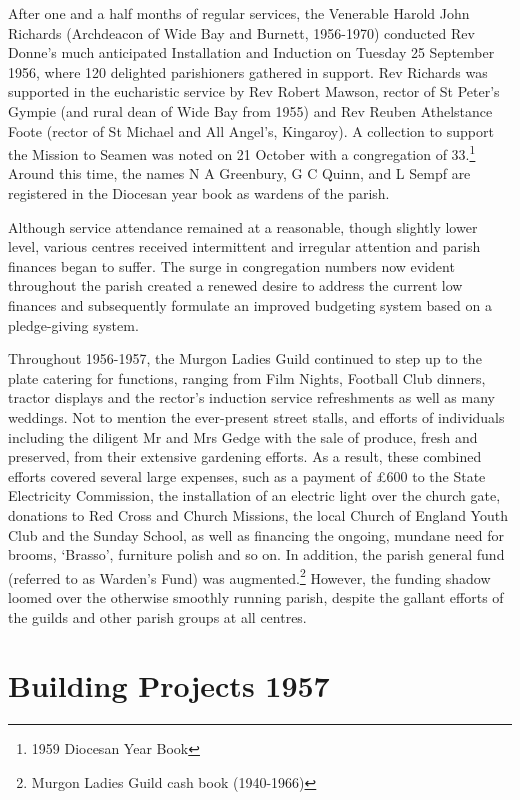 After one and a half months of regular services, the Venerable Harold John Richards (Archdeacon of Wide Bay and Burnett, 1956-1970) conducted Rev Donne's much anticipated Installation and Induction on Tuesday 25 September 1956, where 120 delighted parishioners gathered in support. Rev Richards was supported in the eucharistic service by Rev Robert Mawson, rector of St Peter's Gympie (and rural dean of Wide Bay from 1955) and Rev Reuben Athelstance Foote (rector of St Michael and All Angel's, Kingaroy). A collection to support the Mission to Seamen was noted on 21 October with a congregation of 33.\footnote{1959 Diocesan Year Book} Around this time, the names N A Greenbury, G C Quinn, and L Sempf are registered in the Diocesan year book as wardens of the parish.


Although service attendance remained at a reasonable, though slightly lower level, various centres received intermittent and irregular attention and parish finances began to suffer. The surge in congregation numbers now evident throughout the parish created a renewed desire to address the current low finances and subsequently formulate an improved budgeting system based on a pledge-giving system.



Throughout 1956-1957, the Murgon Ladies Guild continued to step up to the plate catering for functions, ranging from Film Nights, Football Club dinners, tractor displays and the rector's induction service refreshments as well as many weddings. Not to mention the ever-present street stalls, and efforts of individuals including the diligent Mr and Mrs Gedge with the sale of produce, fresh and preserved, from their extensive gardening efforts. As a result, these combined efforts covered several large expenses, such as a payment of \pounds600 to the State Electricity Commission, the installation of an electric light over the church gate, donations to Red Cross and Church Missions, the local Church of England Youth Club and the Sunday School, as well as financing the ongoing, mundane need for brooms, `Brasso', furniture polish and so on. In addition, the parish general fund (referred to as Warden's Fund) was augmented.\footnote{Murgon Ladies Guild cash book (1940-1966)} However, the funding shadow loomed over the otherwise smoothly running parish, despite the gallant efforts of the guilds and other parish groups at all centres.


\section{Building Projects 1957}




